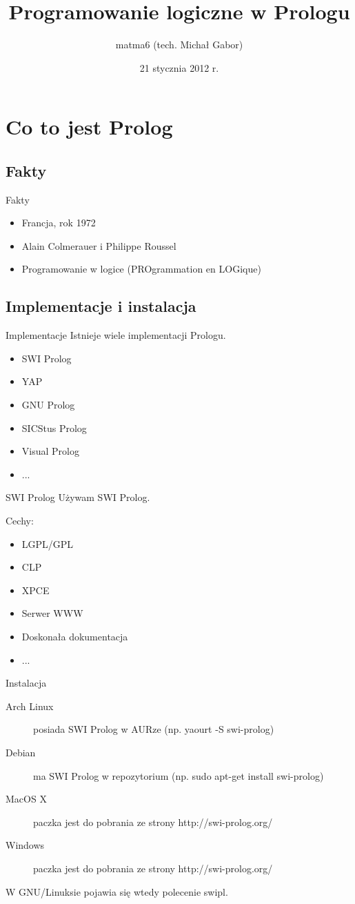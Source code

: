 \documentclass[blue]{beamer}
\author{matma6 (tech. Michał Gabor)}
\title{Programowanie logiczne w Prologu}
\date{21 stycznia 2012 r.}
\begin{document}
\begin{frame}
\titlepage
\end{frame}
\begin{frame}
\tableofcontents
\end{frame}
\section{Co to jest Prolog}
\subsection{Fakty}
\begin{frame}{Fakty}
\begin{itemize}
\item Francja, rok 1972
\item Alain Colmerauer i Philippe Roussel
\item Programowanie w logice (PROgrammation en LOGique)
\end{itemize}
\end{frame}
\subsection{Implementacje i instalacja}
\begin{frame}{Implementacje}
Istnieje wiele implementacji Prologu.
\begin{itemize}
\item SWI Prolog
\item YAP
\item GNU Prolog
\item SICStus Prolog
\item Visual Prolog
\item ...
\end{itemize}
\end{frame}
\begin{frame}{SWI Prolog}
Używam SWI Prolog.

Cechy:
\begin{itemize}
\item LGPL/GPL
\item CLP
\item XPCE
\item Serwer WWW
\item Doskonała dokumentacja
\item ...
\end{itemize}
\end{frame}
\begin{frame}{Instalacja}
\begin{description}
\item[Arch Linux] posiada SWI Prolog w AURze (np. yaourt -S swi-prolog)
\item[Debian] ma SWI Prolog w repozytorium (np. sudo apt-get install swi-prolog)
\item[MacOS X] paczka jest do pobrania ze strony http://swi-prolog.org/
\item[Windows] paczka jest do pobrania ze strony http://swi-prolog.org/
\end{description}

W GNU/Linuksie pojawia się wtedy polecenie swipl.
\end{frame}
\end{document}
